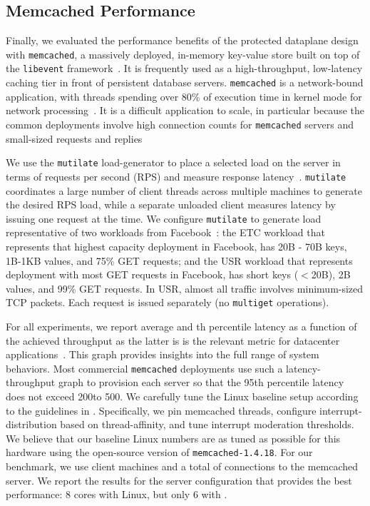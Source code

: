 
\subsection{Memcached Performance}
\label{sec:eval:memcached}




Finally, we evaluated the performance benefits of the \ix protected
dataplane design with \texttt{memcached}, a massively deployed,
in-memory key-value store built on top of the \texttt{libevent}
framework~\cite{url:memcached}. It is frequently used as a
high-throughput, low-latency caching tier in front of persistent
database servers. \texttt{memcached} is a network-bound application,
with threads spending over 80\% of execution time in kernel mode for
network processing~\cite{DBLP:conf/eurosys/LeverichK14}. It is a difficult
application to scale, in particular because the common deployments
involve high connection counts for \texttt{memcached} servers and
small-sized requests and
replies~\cite{DBLP:conf/nsdi/NishtalaFGKLLMPPSSTV13,Atikoglu:2012:WAL}

We use the \texttt{mutilate} load-generator to place a selected load
on the server in terms of requests per second (RPS) and measure
response latency~\cite{url:mutilate}. \texttt{mutilate} coordinates a
large number of client threads across multiple machines to generate
the desired RPS load, while a separate unloaded client measures
latency by issuing one request at the time.  We configure
\texttt{mutilate} to generate load representative of two workloads
from Facebook~\cite{Atikoglu:2012:WAL}: the ETC workload that
represents that highest capacity deployment in Facebook, has 20B - 70B
keys, 1B-1KB values, and 75\% GET requests; and the USR workload that
represents deployment with most GET requests in Facebook, has short
keys ($<$20B), 2B values, and 99\% GET requests. In USR, almost all
traffic involves minimum-sized TCP packets. Each request is issued
separately (no \texttt{multiget} operations).


For all experiments, we report average and th percentile latency as
a function of the achieved throughput as the latter is is the relevant metric
for datacenter applications~\cite{DBLP:journals/cacm/DeanB13}. This
graph provides insights into the full range of system behaviors. Most
commercial \texttt{memcached} deployments use such a
latency-throughput graph to provision each server so that the 95th 
percentile latency does not exceed 200\microsecond to 500\microsecond.
We carefully tune the Linux baseline setup according to the guidelines
in \cite{DBLP:conf/eurosys/LeverichK14}. Specifically, we pin memcached threads,
configure interrupt-distribution based on thread-affinity, and tune
interrupt moderation thresholds. We believe that our baseline Linux
numbers are as tuned as possible for this hardware using the
open-source version of \texttt{memcached-1.4.18}. For our benchmark,
we use  client machines  and a total of  connections to the
memcached server.  We report the results for the server configuration
that provides the best performance: 8 cores with Linux, but only 6
with \ix.

